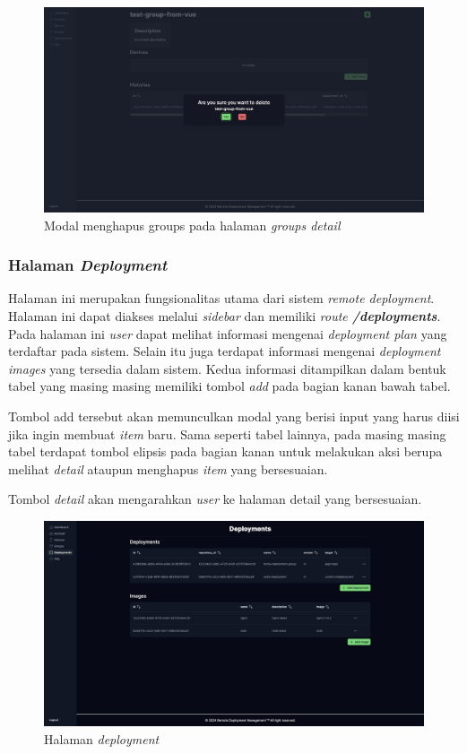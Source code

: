 \begin{figure}[h]
  \centering
  \includegraphics[width=1\textwidth]{resources/chapter-4/dashboard/groups-detail-delete.jpg}
  \caption{Modal menghapus groups pada halaman \textit{groups detail}}
  \label{fig:halaman-groups-detail-delete}
\end{figure}

\pagebreak

\subsubsection{Halaman \textit{Deployment}}
Halaman ini merupakan fungsionalitas utama dari sistem \textit{remote deployment}. Halaman ini dapat diakses melalui \textit{sidebar} dan memiliki \textit{route \textbf{/deployments}}. Pada halaman ini \textit{user} dapat melihat informasi mengenai \textit{deployment plan} yang terdaftar pada sistem. Selain itu juga terdapat informasi mengenai \textit{deployment images} yang tersedia dalam sistem. Kedua informasi ditampilkan dalam bentuk tabel yang masing masing memiliki tombol \textit{add} pada bagian kanan bawah tabel.

Tombol add tersebut akan memunculkan modal yang berisi input yang harus diisi jika ingin membuat \textit{item} baru. Sama seperti tabel lainnya, pada masing masing tabel terdapat tombol elipsis pada bagian kanan untuk melakukan aksi berupa melihat \textit{detail} ataupun menghapus \textit{item} yang bersesuaian.

Tombol \textit{detail} akan mengarahkan \textit{user} ke halaman detail yang bersesuaian.

\begin{figure}[h]
  \centering
  \includegraphics[width=1\textwidth]{resources/chapter-4/dashboard/deployment-page.jpg}
  \caption{Halaman \textit{deployment}}
  \label{fig:halaman-deployment}
\end{figure}

